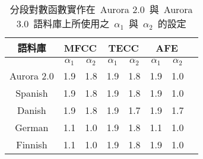 \begin{table}[!htb]
\label{table:parameterset}
\caption{分段對數函數實作在~Aurora 2.0~與~Aurora 3.0~語料庫上所使用之~$\alpha_1$~與~$\alpha_2$~的設定}
\centering
\begin{tabular}{c|c|c|c|c|c|cl}
 {語料庫} &  \multicolumn{2}{c|}{MFCC}  
& \multicolumn{2}{c|}{TECC} 
& \multicolumn{2}{c}{AFE} \\
\hline
& $\alpha_1$ & $\alpha_2$ & $\alpha_1$ & $\alpha_2$ & $\alpha_1$ & $\alpha_2$ \\
\hline
\multicolumn{1}{c|}{Aurora 2.0} &
\multicolumn{1}{c|}{1.9} & {1.8} &
                    {1.9} & {1.8}  &
                    {1.9} & {1.0}   \\  
\multicolumn{1}{c|}{Spanish} &
\multicolumn{1}{c|}{1.9} & {1.8} &
                    {1.9} & {1.8}  &
                    {1.9} & {1.0}   \\ 
\multicolumn{1}{c|}{Danish} &
\multicolumn{1}{c|}{1.9} & {1.8} &
                    {1.9} & {1.7}  &
                    {1.9} & {1.7}   \\ 
\multicolumn{1}{c|}{German} &
\multicolumn{1}{c|}{1.1} & {1.0} &
                    {1.9} & {1.8}  &
                    {1.1} & {1.0}   \\ 
\multicolumn{1}{c|}{Finnish} &
\multicolumn{1}{c|}{1.1} & {1.0} &
                    {1.9} & {1.8}  &
                    {1.9} & {1.0}   \\ 					
\hline
\end{tabular}
\end{table}



